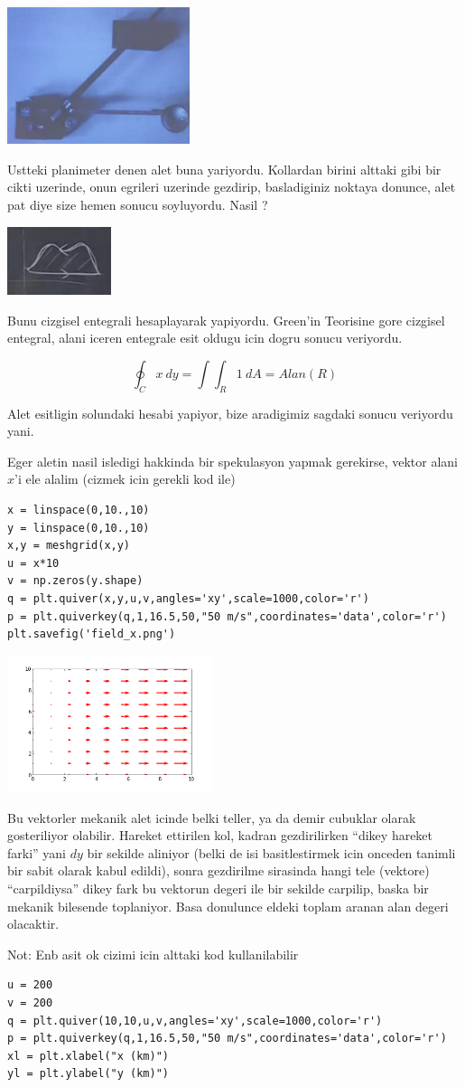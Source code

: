 \documentclass[12pt,fleqn]{article}\usepackage{../common}
\begin{document}
\includegraphics[height=4cm]{22_9.png}

Ustteki planimeter denen alet buna yariyordu. Kollardan birini alttaki gibi
bir cikti uzerinde, onun egrileri uzerinde gezdirip, basladiginiz noktaya
donunce, alet pat diye size hemen sonucu soyluyordu. Nasil ?

\includegraphics[height=2cm]{22_10.png}

Bunu cizgisel entegrali hesaplayarak yapiyordu. Green'in Teorisine gore
cizgisel entegral, alani iceren entegrale esit oldugu icin dogru sonucu
veriyordu.

\[ \oint_C x \ dy  = \int \int_R 1 \ dA = Alan(R) \]

Alet esitligin solundaki hesabi yapiyor, bize aradigimiz sagdaki sonucu
veriyordu yani. 

Eger aletin nasil isledigi hakkinda bir spekulasyon yapmak gerekirse,
vektor alani $x$'i ele alalim (cizmek icin gerekli kod ile)

\begin{verbatim}
x = linspace(0,10.,10)
y = linspace(0,10.,10)
x,y = meshgrid(x,y)
u = x*10
v = np.zeros(y.shape)
q = plt.quiver(x,y,u,v,angles='xy',scale=1000,color='r')
p = plt.quiverkey(q,1,16.5,50,"50 m/s",coordinates='data',color='r')
plt.savefig('field_x.png')
\end{verbatim}

\includegraphics[height=4cm]{field_x.png}

Bu vektorler mekanik alet icinde belki teller, ya da demir cubuklar olarak
gosteriliyor olabilir. Hareket ettirilen kol, kadran gezdirilirken ``dikey
hareket farki'' yani $dy$ bir sekilde aliniyor (belki de isi basitlestirmek
icin onceden tanimli bir sabit olarak kabul edildi), sonra gezdirilme
sirasinda hangi tele (vektore) ``carpildiysa'' dikey fark bu vektorun
degeri ile bir sekilde carpilip, baska bir mekanik bilesende
toplaniyor. Basa donulunce eldeki toplam aranan alan degeri olacaktir.

Not: Enb asit ok cizimi icin alttaki kod kullanilabilir

\begin{verbatim}
u = 200
v = 200
q = plt.quiver(10,10,u,v,angles='xy',scale=1000,color='r')
p = plt.quiverkey(q,1,16.5,50,"50 m/s",coordinates='data',color='r')
xl = plt.xlabel("x (km)")
yl = plt.ylabel("y (km)")
\end{verbatim}
\end{document}
